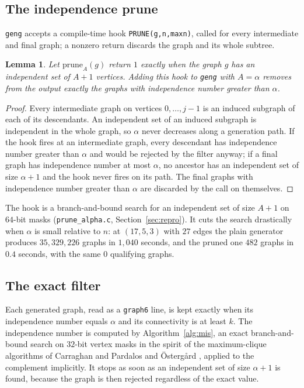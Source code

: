 \documentclass[11pt]{article}
\newtheorem{lemma}[theorem]{Lemma}
\theoremstyle{definition}
\theoremstyle{remark}
\begin{document}
\subsection{The independence prune}

\texttt{geng} accepts a compile-time hook \texttt{PRUNE(g,n,maxn)}, called for every intermediate and final graph; a
nonzero return discards the graph and its whole subtree.

\begin{lemma}\label{lem:prune}
Let $\mathrm{prune}_A(g)$ return $1$ exactly when the graph $g$ has an independent set of $A+1$ vertices. Adding this
hook to \texttt{geng} with $A=\alpha$ removes from the output exactly the graphs with independence number greater than
$\alpha$.
\end{lemma}

\begin{proof}
Every intermediate graph on vertices $0,\dots,j-1$ is an induced subgraph of each of its descendants. An independent
set of an induced subgraph is independent in the whole graph, so $\alpha$ never decreases along a generation path. If
the hook fires at an intermediate graph, every descendant has independence number greater than $\alpha$ and would be
rejected by the filter anyway; if a final graph has independence number at most $\alpha$, no ancestor has an
independent set of size $\alpha+1$ and the hook never fires on its path. The final graphs with independence number
greater than $\alpha$ are discarded by the call on themselves.
\end{proof}

The hook is a branch-and-bound search for an independent set of size $A+1$ on $64$-bit masks
(\texttt{prune\_alpha.c}, Section~\ref{sec:repro}). It cuts the search drastically when $\alpha$ is small relative to
$n$: at $(17,5,3)$ with $27$ edges the plain generator produces $35{,}329{,}226$ graphs in $1{,}040$ seconds, and the
pruned one $482$ graphs in $0.4$ seconds, with the same $0$ qualifying graphs.

\subsection{The exact filter}

Each generated graph, read as a \texttt{graph6} line, is kept exactly when its independence number equals $\alpha$ and
its connectivity is at least $k$. The independence number is computed by Algorithm~\ref{alg:mis}, an exact
branch-and-bound search on $32$-bit vertex masks in the spirit of the maximum-clique algorithms of Carraghan and
Pardalos \cite{CarraghanPardalos} and \"Osterg\aa rd \cite{Ostergard}, applied to the complement implicitly. It stops
as soon as an independent set of size $\alpha+1$ is found, because the graph is then rejected regardless of the exact
value.
\end{document}
